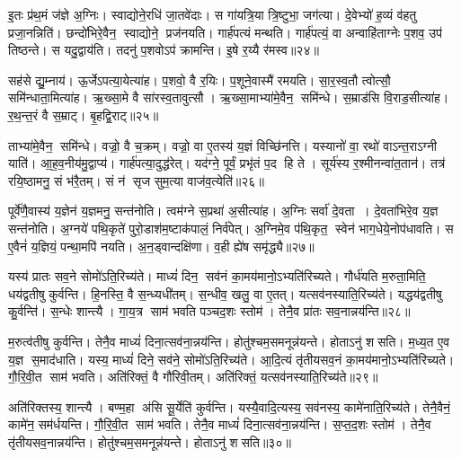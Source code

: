 इ॒तः प्र॑थ॒मं ज॑ज्ञे अ॒ग्निः।
स्वाद्योने॒रधि॑ जा॒तवे॑दाः।
स गा॑यत्रि॒या त्रि॒ष्टुभा॒ जग॑त्या।
दे॒वेभ्यो॑ ह॒व्यं व॑हतु प्रजा॒नन्निति॑।
छन्दो॑भिरे॒वैन॒ स्वाद्योने॒ प्रज॑नयति।
गार्\mbox{}ह॑पत्यं मन्थति।
गार्\mbox{}ह॑पत्यं॒ वा अन्वाहि॑ताग्नेः प॒शव॒ उप॑ तिष्ठन्ते।
स यदु॒द्वाय॑ति।
तदनु॑ प॒शवोऽप॑ क्रामन्ति।
इ॒षे र॒य्यै र॑मस्व॥२४॥

सह॑से द्यु॒म्नाय॑।
ऊ॒र्जेऽपत्या॒येत्या॑ह।
प॒शवो॒ वै र॒यिः।
प॒शूने॒वास्मै॑ रमयति।
सा॒र॒स्व॒तौ त्वोत्सौ॒ समि॑न्धाता॒मित्या॑ह।
ऋ॒ख्सा॒मे वै सा॑रस्व॒तावुत्सौ।
ऋ॒ख्सा॒माभ्या॑मे॒वैन॒ समि॑न्धे।
स॒म्राड॑सि वि॒राड॒सीत्या॑ह।
र॒थ॒न्त॒रं वै स॒म्राट्।
बृ॒हद्वि॒राट्॥२५॥

ताभ्या॑मे॒वैन॒ समि॑न्धे।
वज्रो॒ वै च॒क्रम्।
वज्रो॒ वा ए॒तस्य॑ य॒ज्ञं विच्छि॑नत्ति।
यस्यानो॑ वा॒ रथो॑ वाऽन्त॒राऽग्नी याति॑।
आ॒ह॒व॒नीय॑मु॒द्वाप्य॑।
गार्\mbox{}ह॑पत्या॒दुद्ध॑रेत्।
यद॑ग्ने॒ पूर्वं॒ प्रभृ॑तं प॒द हि ते।
सूर्य॑स्य र॒श्मीनन्वा॑त॒तान॑।
तत्र॑ रयि॒ष्ठामनु॒ सं भ॑रै॒तम्।
सं न॑ सृज सुम॒त्या वाज॑व॒त्येति॑॥२६॥

पूर्वे॑णै॒वास्य॑ य॒ज्ञेन॑ य॒ज्ञमनु॒ सन्त॑नोति।
त्वम॑ग्ने स॒प्रथा॑ अ॒सीत्या॑ह।
अ॒ग्निः सर्वा॑ दे॒वता।
दे॒वता॑भिरे॒व य॒ज्ञ सन्त॑नोति।
अ॒ग्नये॑ पथि॒कृते॑ पुरो॒डाश॑म॒ष्टाक॑पालं॒ निर्व॑पेत्।
अ॒ग्निमे॒व प॑थि॒कृत॒ स्वेन॑ भाग॒धेये॒नोप॑धावति।
स ए॒वैनं॑ य॒ज्ञियं॒ पन्था॒मपि॑ नयति।
अ॒न॒ड्वान्दक्षि॑णा।
व॒ही ह्ये॑ष समृ॑द्ध्यै॥२७॥

यस्य॑ प्रातः सव॒ने सोमो॑ऽति॒रिच्य॑ते।
माध्यं॑ दिन॒ सव॑नं का॒मय॑मानो॒ऽभ्यति॑रिच्यते।
गौर्ध॑यति म॒रुता॒मिति॒ धय॑द्वतीषु कुर्वन्ति।
हि॒नस्ति॒ वै स॒न्ध्यधी॑तम्।
स॒न्धीव॒ खलु॒ वा ए॒तत्।
यत्सव॑नस्याति॒रिच्य॑ते।
यद्धय॑द्वतीषु कु॒र्वन्ति॑।
स॒न्धेः शान्त्यै।
गा॒य॒त्र साम॑ भवति पञ्चद॒शः स्तोम॑।
तेनै॒व प्रा॑तः सव॒नान्नय॑न्ति॥२८॥

म॒रुत्व॑तीषु कुर्वन्ति।
तेनै॒व माध्यं॑ दिना॒त्सव॑ना॒न्नय॑न्ति।
होतु॑श्चम॒समनून्न॑यन्ते।
होताऽनु॑ शसति।
म॒ध्य॒त ए॒व य॒ज्ञ स॒माद॑धाति।
यस्य॒ माध्यं॑ दिने॒ सव॑ने॒ सोमो॑ऽति॒रिच्य॑ते।
आ॒दि॒त्यं तृ॑तीयसव॒नं का॒मय॑मानो॒ऽभ्यति॑रिच्यते।
गौ॒रि॒वी॒त साम॑ भवति।
अति॑रिक्तं॒ वै गौ॑रिवी॒तम्।
अति॑रिक्तं॒ यत्सव॑नस्याति॒रिच्य॑ते॥२९॥

अति॑रिक्तस्य॒ शान्त्यै।
बण्म॒हा अ॑सि सू॒र्येति॑ कुर्वन्ति।
यस्यै॒वादि॒त्यस्य॒ सव॑नस्य॒ कामे॑नाति॒रिच्य॑ते।
तेनै॒वैनं॒ कामे॑न॒ सम॑र्धयन्ति।
गौ॒रि॒वी॒त साम॑ भवति।
तेनै॒व माध्यं॑ दिना॒त्सव॑ना॒न्नय॑न्ति।
स॒प्त॒द॒शः स्तोम॑।
तेनै॒व तृ॑तीयसव॒नान्नय॑न्ति।
होतु॑श्चम॒समनून्न॑यन्ते।
होताऽनु॑ शसति॥३०॥

